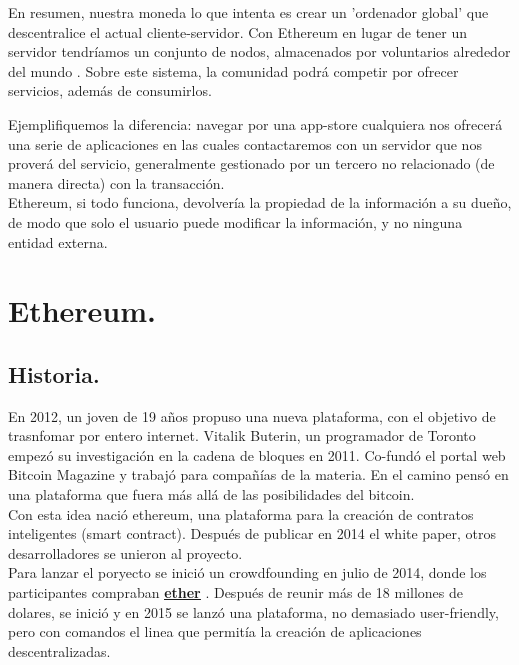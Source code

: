 \documentclass[11pt,a4paper]{article}
\begin{document}

En resumen, nuestra moneda lo que intenta es crear un 'ordenador  global' que descentralice el actual cliente-servidor. Con Ethereum en lugar de tener un servidor tendríamos un conjunto de nodos, almacenados por voluntarios alrededor del mundo . Sobre este sistema, la comunidad podrá competir por ofrecer servicios, además de consumirlos.


Ejemplifiquemos la diferencia: navegar por una app-store cualquiera nos ofrecerá una serie de aplicaciones en las cuales contactaremos con un servidor que nos proverá del servicio, generalmente gestionado por un tercero no relacionado (de manera directa) con la transacción.\\

Ethereum, si todo funciona, devolvería la propiedad de la información a su dueño, de modo que solo el usuario puede modificar la información, y no ninguna entidad externa.\\



\section{Ethereum.\\}


\subsection{Historia.}
En 2012, un joven de 19 años propuso una nueva plataforma, con el objetivo de trasnfomar por entero internet. Vitalik Buterin, un programador de Toronto empezó su investigación en la cadena de bloques en 2011. Co-fundó el portal web Bitcoin Magazine y trabajó para compañías de la materia. En el camino pensó en una plataforma que fuera más allá de las posibilidades del bitcoin.\\

Con esta idea nació ethereum, una plataforma para la creación de contratos inteligentes (smart contract). Después de publicar en 2014 el white paper, otros desarrolladores se unieron al proyecto. \\

Para lanzar el poryecto se inició un crowdfounding en julio de 2014, donde los participantes compraban \hyperref[sec:ether]{\textbf{\underline{ether}}} . Después de reunir más de 18 millones de dolares, se inició y en 2015 se lanzó una plataforma, no demasiado user-friendly, pero con comandos el linea que permitía la creación de aplicaciones descentralizadas.\\
\end{document}
